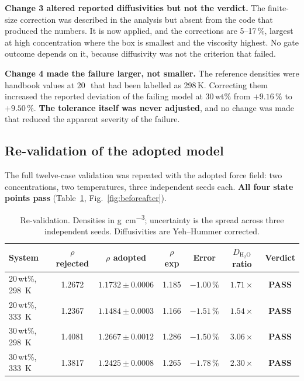 \documentclass[11pt,a4paper]{article}
\begin{document}
\textbf{Change 3 altered reported diffusivities but not the verdict.} The finite-size correction was
described in the analysis but absent from the code that produced the numbers. It is now applied, and
the corrections are 5--17\,\%, largest at high concentration where the box is smallest and the
viscosity highest. No gate outcome depends on it, because diffusivity was not the criterion that
failed.

\textbf{Change 4 made the failure larger, not smaller.} The reference densities were handbook values
at 20\,\textcelsius\ that had been labelled as 298\,K. Correcting them increased the reported
deviation of the failing model at 30\,wt\% from $+9.16\,\%$ to $+9.50\,\%$. \textbf{The
tolerance itself was never adjusted}, and no change was made that reduced the apparent severity of
the failure.

\subsection{Re-validation of the adopted model}\label{sec:reval}

The full twelve-case validation was repeated with the adopted force field: two concentrations, two
temperatures, three independent seeds each. \textbf{All four state points pass}
(Table~\ref{tab:reval}, Fig.~\ref{fig:beforeafter}).

\begin{table}[htbp]\centering\small
\caption{Re-validation. Densities in \si{\gram\per\cubic\centi\metre}; uncertainty is the
spread across three independent seeds. Diffusivities are Yeh--Hummer corrected.}
\label{tab:reval}
\begin{tabular}{@{}lcccccc@{}}
\toprule
System & $\rho$ rejected & $\rho$ adopted & $\rho$ exp & Error & $D_{\mathrm{H_2O}}$ ratio & Verdict \\
\midrule
20\,wt\%, \SI{298}{\kelvin} & 1.2672 & $1.1732\pm0.0006$ & 1.185 & $-1.00\,\%$ & $1.71\times$ & \textbf{PASS} \\
20\,wt\%, \SI{333}{\kelvin} & 1.2367 & $1.1484\pm0.0003$ & 1.166 & $-1.51\,\%$ & $1.54\times$ & \textbf{PASS} \\
30\,wt\%, \SI{298}{\kelvin} & 1.4081 & $1.2667\pm0.0012$ & 1.286 & $-1.50\,\%$ & $3.06\times$ & \textbf{PASS} \\
30\,wt\%, \SI{333}{\kelvin} & 1.3817 & $1.2425\pm0.0008$ & 1.265 & $-1.78\,\%$ & $2.30\times$ & \textbf{PASS} \\
\bottomrule
\end{tabular}
\end{table}
\end{document}
